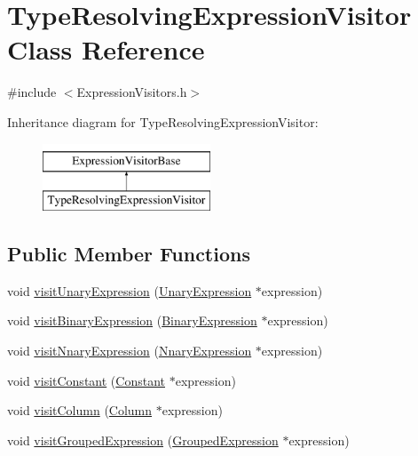\hypertarget{class_type_resolving_expression_visitor}{\section{Type\+Resolving\+Expression\+Visitor Class Reference}
\label{class_type_resolving_expression_visitor}
}


{\ttfamily \#include $<$Expression\+Visitors.\+h$>$}

Inheritance diagram for Type\+Resolving\+Expression\+Visitor\+:\begin{figure}[H]
\begin{center}
\leavevmode
\includegraphics[height=2.000000cm]{class_type_resolving_expression_visitor}
\end{center}
\end{figure}
\subsection*{Public Member Functions}
\begin{DoxyCompactItemize}
\item 
void \hyperlink{class_type_resolving_expression_visitor_a9ae5e5542bbcdfbf81c7c6efb5b3e4fe}{visit\+Unary\+Expression} (\hyperlink{class_unary_expression}{Unary\+Expression} $\ast$expression)
\item 
void \hyperlink{class_type_resolving_expression_visitor_a6f4aca2ea71660065b44815b2a7e6bd8}{visit\+Binary\+Expression} (\hyperlink{class_binary_expression}{Binary\+Expression} $\ast$expression)
\item 
void \hyperlink{class_type_resolving_expression_visitor_a75c505a51dc15d3d4a7c2e5c539f04e7}{visit\+Nnary\+Expression} (\hyperlink{class_nnary_expression}{Nnary\+Expression} $\ast$expression)
\item 
void \hyperlink{class_type_resolving_expression_visitor_a7c5f29e6a4331aafc5bba63e3af64ecd}{visit\+Constant} (\hyperlink{class_constant}{Constant} $\ast$expression)
\item 
void \hyperlink{class_type_resolving_expression_visitor_a1ea3d7f6a0ebd1296df38d71420596bd}{visit\+Column} (\hyperlink{class_column}{Column} $\ast$expression)
\item 
void \hyperlink{class_type_resolving_expression_visitor_a51d54742c7529b2e14b1e3b1ded6c806}{visit\+Grouped\+Expression} (\hyperlink{class_grouped_expression}{Grouped\+Expression} $\ast$expression)
\end{DoxyCompactItemize}
